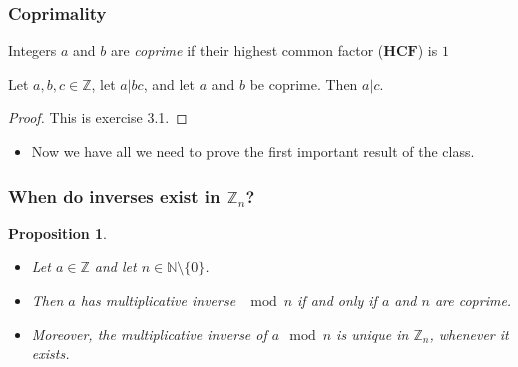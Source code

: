 \documentclass[handout]{beamer}
\newtheorem{proposition}[theorem]{Proposition}{\bfseries}{\itshape}
\newcommand{\HCF}{\mathbf{HCF}}
\newcommand{\bN}{\mathbb{N}}
\newcommand{\bZ}{\mathbb{Z}}
\begin{document}
\begin{frame}
\frametitle{Coprimality}
\begin{definition}[Coprime]
Integers $a$ and $b$ are \emph{coprime} if their highest common factor ($\HCF$)  is $1$
\end{definition}

\begin{lemma}\label{L:div3}
Let $a,b,c\in\bZ$, let $a|bc$, and let $a$ and $b$ be coprime. Then $a|c$.
\end{lemma}
\begin{proof}
This is exercise 3.1.
\end{proof}
\vspace{0.5cm} 
\begin{itemize}
\item Now we have all we need to prove the first important result of the class.
\end{itemize}

\end{frame}

\begin{frame}
\frametitle{When do inverses exist in $\bZ_n$?}
\begin{proposition}\label{P:inv}
\begin{itemize}
\item Let $a\in \bZ$ and let $n\in\bN\setminus\{0\}$. 
\vspace{0.2cm} 
\item Then $a$ has multiplicative inverse $\mod n$ if and only if $a$ and $n$ are coprime. 
\vspace{0.2cm} 
\item Moreover, the multiplicative inverse of $a\mod n$ is unique in $\bZ_n$, whenever it exists. 
\end{itemize}
\end{proposition}

\end{frame}
\end{document}
